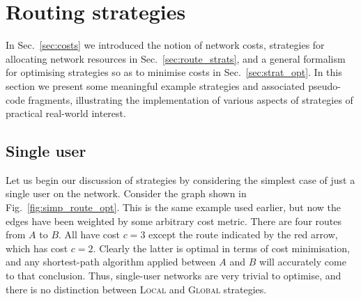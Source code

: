 \documentclass[aps,rmp,twocolumn,amsmath,amssymb,nofootinbib,superscriptaddress,longbibliography,floatfix,table-of-contents,eqsecnum]{revtex4-1}
\begin{document}
%
%

\section{Routing strategies} \label{sec:strategies} 

In Sec.~\ref{sec:costs} we introduced the notion of network costs, strategies for allocating network resources in Sec.~\ref{sec:route_strats}, and a general formalism for optimising strategies so as to minimise costs in Sec.~\ref{sec:strat_opt}. In this section we present some meaningful example strategies and associated pseudo-code fragments, illustrating the implementation of various aspects of strategies of practical real-world interest.

%
%

\subsection{Single user} \label{sec:single_user_shortest} 

Let us begin our discussion of strategies by considering the simplest case of just a single user on the network. Consider the graph shown in Fig.~\ref{fig:simp_route_opt}. This is the same example used earlier, but now the edges have been weighted by some arbitrary cost metric. There are four routes from $A$ to $B$. All have cost \mbox{$c=3$} except the route indicated by the red arrow, which has cost \mbox{$c=2$}. Clearly the latter is optimal in terms of cost minimisation, and any shortest-path algorithm applied between $A$ and $B$ will accurately come to that conclusion. Thus, single-user networks are very trivial to optimise, and there is no distinction between \textsc{Local} and \textsc{Global} strategies.
\end{document}

